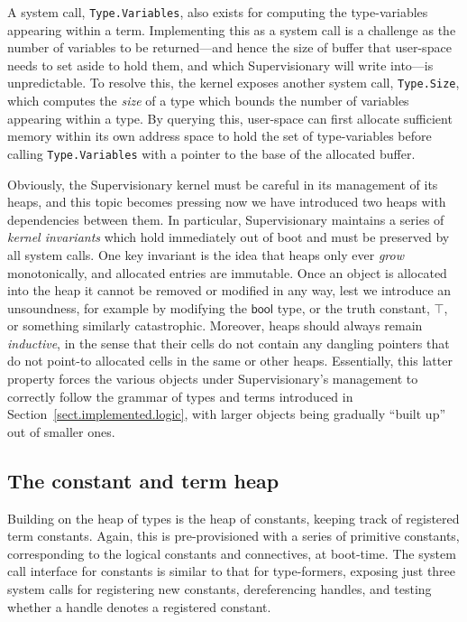 \documentclass[a4paper, UKenglish, cleveref, autoref, thm-restate, colorlinks]{lipics-v2021}
\begin{document}
A system call, \texttt{Type.Variables}, also exists for computing the type-variables appearing within a term.
Implementing this as a system call is a challenge as the number of variables to be returned---and hence the size of buffer that user-space needs to set aside to hold them, and which Supervisionary will write into---is unpredictable.
To resolve this, the kernel exposes another system call, \texttt{Type.Size}, which computes the \emph{size} of a type which bounds the number of variables appearing within a type.
By querying this, user-space can first allocate sufficient memory within its own address space to hold the set of type-variables before calling \texttt{Type.Variables} with a pointer to the base of the allocated buffer.

Obviously, the Supervisionary kernel must be careful in its management of its heaps, and this topic becomes pressing now we have introduced two heaps with dependencies between them.
In particular, Supervisionary maintains a series of \emph{kernel invariants} which hold immediately out of boot and must be preserved by all system calls.
One key invariant is the idea that heaps only ever \emph{grow} monotonically, and allocated entries are immutable.
Once an object is allocated into the heap it cannot be removed or modified in any way, lest we introduce an unsoundness, for example by modifying the $\mathsf{bool}$ type, or the truth constant, $\top$, or something similarly catastrophic.
Moreover, heaps should always remain \emph{inductive}, in the sense that their cells do not contain any dangling pointers that do not point-to allocated cells in the same or other heaps.
Essentially, this latter property forces the various objects under Supervisionary's management to correctly follow the grammar of types and terms introduced in Section~\ref{sect.implemented.logic}, with larger objects being gradually ``built up'' out of smaller ones.

\subsection{The constant and term heap}

Building on the heap of types is the heap of constants, keeping track of registered term constants.
Again, this is pre-provisioned with a series of primitive constants, corresponding to the logical constants and connectives, at boot-time.
The system call interface for constants is similar to that for type-formers, exposing just three system calls for registering new constants, dereferencing handles, and testing whether a handle denotes a registered constant.
\end{document}
